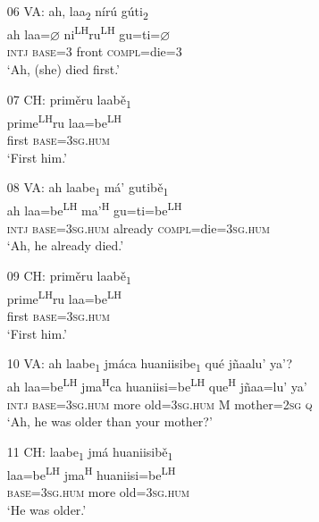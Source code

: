 \begin{itemize}
\item[06 VA:]
\glll ah, laa\textsubscript{2} n\'{i}r\'{u} g\'{u}ti\textsubscript{2}  \\
ah laa={$\varnothing$} ni\textsuperscript{LH}ru\textsuperscript{LH} gu=ti={$\varnothing$}  \\
\textsc{intj} \textsc{base}=\textsc{3} front \textsc{compl}=die=\textsc{3}  \\
\glt `Ah, (she) died first.'


\item[07 CH:]
\glll prim\v{e}ru laab\v{e}\textsubscript{1}  \\                                    
prime\textsuperscript{LH}ru laa=be\textsuperscript{LH} \\
first \textsc{base}=\textsc{3sg.hum} \\
\glt `First him.'


\item[08 VA:] 	
\glll ah laabe\textsubscript{1} m\'{a}' gutib\v{e}\textsubscript{1} \\
ah laa=be\textsuperscript{LH}  ma'\textsuperscript{H} gu=ti=be\textsuperscript{LH}   \\
\textsc{intj} \textsc{base}=\textsc{3sg.hum} already \textsc{compl}=die=\textsc{3sg.hum}  \\
\glt `Ah, he already died.'


\item[09 CH:]
\glll prim\v{e}ru laab\v{e}\textsubscript{1}  \\                                    
prime\textsuperscript{LH}ru laa=be\textsuperscript{LH}   \\
first \textsc{base}=\textsc{3sg.hum}  \\
\glt `First him.'


\item[10 VA:]
\glll ah laabe\textsubscript{1} jm\'{a}ca huaniisibe\textsubscript{1} qu\'{e} j\~{n}aalu' ya'?  \\
ah laa=be\textsuperscript{LH}  jma\textsuperscript{H}ca huaniisi=be\textsuperscript{LH}  que\textsuperscript{H} j\~{n}aa=lu' ya'  \\
\textsc{intj} \textsc{base}=\textsc{3sg.hum} more old=\textsc{3sg.hum} M mother=\textsc{2sg} \textsc{q}  \\
\glt `Ah, he was older than your mother?'


\item[11 CH:]
\glll laabe\textsubscript{1} jm\'{a} huaniisib\v{e}\textsubscript{1} \\
laa=be\textsuperscript{LH}  jma\textsuperscript{H} huaniisi=be\textsuperscript{LH}   \\
\textsc{base}=\textsc{3sg.hum} more old=\textsc{3sg.hum}  \\    	 
\glt `He was older.'



\end{itemize}
